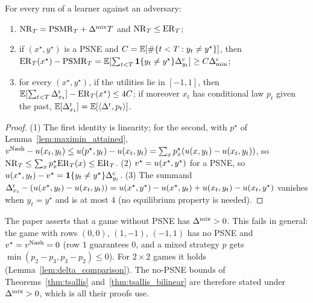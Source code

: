 \begin{lemma}
  \label{lem:regret_relations}
  \leanok
  For every run of a learner against an adversary:
  \begin{enumerate}
    \item $\mathrm{NR}_T = \mathrm{PSMR}_T + \Delta^{\mathrm{mix}} T$ and $\mathrm{NR}_T \le \mathrm{ER}_T$;
    \item if $(x^\star, y^\star)$ is a PSNE and $C = \mathbb{E}[\#\{t < T : y_t \ne y^\star\}]$, then
      $\mathrm{ER}_T(x^\star) - \mathrm{PSMR}_T = \mathbb{E}[\sum_{t < T} \mathbf{1}\{y_t \ne y^\star\} \Delta^{\mathrm{c}}_{y_t}] \ge C \Delta^{\mathrm{c}}_{\min}$;
    \item for every $(x^\star, y^\star)$, if the utilities lie in $[-1, 1]$, then
      $\mathbb{E}[\sum_{t < T} \Delta^{\mathrm{r}}_{x_t}] - \mathrm{ER}_T(x^\star) \le 4 C$; if moreover $x_t$ has conditional law
      $p_t$ given the past, $\mathbb{E}[\Delta^{\mathrm{r}}_{x_t}] = \mathbb{E}[\langle \Delta^{\mathrm{r}}, p_t\rangle]$.
  \end{enumerate}
\end{lemma}

\begin{proof}
  \leanok
  (1) The first identity is linearity; for the second, with $p^\star$ of
  Lemma~\ref{lem:maximin_attained},
  $v^{\mathrm{Nash}} - u(x_t, y_t) \le u(p^\star, y_t) - u(x_t, y_t) = \sum_x p^\star_x (u(x, y_t) - u(x_t, y_t))$,
  so $\mathrm{NR}_T \le \sum_x p^\star_x \mathrm{ER}_T(x) \le \mathrm{ER}_T$. (2) $v^\star = u(x^\star, y^\star)$ for a
  PSNE, so $u(x^\star, y_t) - v^\star = \mathbf{1}\{y_t \ne y^\star\} \Delta^{\mathrm{c}}_{y_t}$. (3) The summand
  $\Delta^{\mathrm{r}}_{x_t} - (u(x^\star, y_t) - u(x_t, y_t)) = u(x^\star, y^\star) - u(x^\star, y_t) + u(x_t, y_t) -
  u(x_t, y^\star)$ vanishes when $y_t = y^\star$ and is at most $4$ (no equilibrium property is
  needed).
\end{proof}

\begin{remark}
  \label{rem:no_psne_gap}
  The paper asserts that a game without PSNE has $\Delta^{\mathrm{mix}} > 0$. This fails in general: the game with
  rows $(0, 0)$, $(1, -1)$, $(-1, 1)$ has no PSNE and $v^\star = v^{\mathrm{Nash}} = 0$ (row $1$ guarantees $0$,
  and a mixed strategy $p$ gets $\min(p_2 - p_3, p_3 - p_2) \le 0$). For $2 \times 2$ games it holds
  (Lemma~\ref{lem:delta_comparison}). The no-PSNE bounds of Theorems~\ref{thm:tsallis}
  and~\ref{thm:tsallis_bilinear} are therefore stated under $\Delta^{\mathrm{mix}} > 0$, which is all their proofs
  use.
\end{remark}

